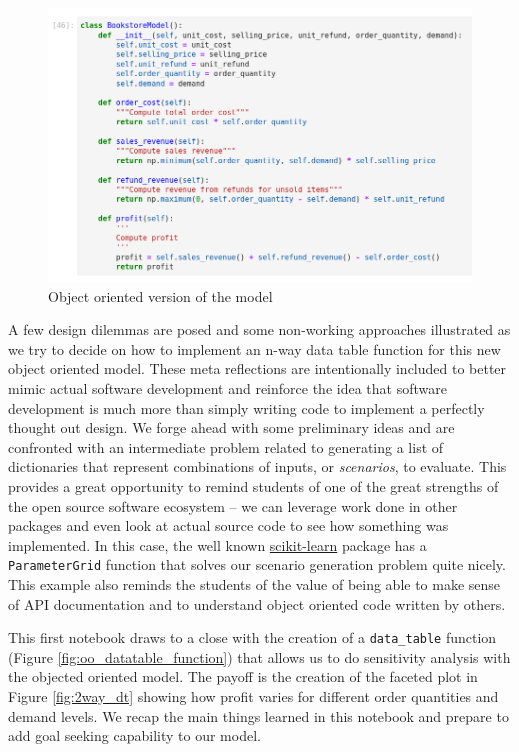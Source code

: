 \documentclass[ited]{informs3}                      %
\newcommand{\code}[1]{\texttt{#1}}
\begin{document}
\begin{figure}[!htbp]
	\centering
	\includegraphics[scale=0.5]{images/oo_model}
	\caption{Object oriented version of the model}
	\label{fig:oo_model}
\end{figure}

A few design dilemmas are posed and some non-working approaches illustrated as we try to decide on how to implement an n-way data table function for this new object oriented model. These meta reflections are intentionally included to better mimic actual software development and reinforce the idea that software development is much more than simply writing code to implement a perfectly thought out design. We forge ahead with some preliminary ideas and are confronted with an intermediate problem related to generating a list of dictionaries that represent combinations of inputs, or \textit{scenarios}, to evaluate. This provides a great opportunity to remind students of one of the great strengths of the open source software ecosystem -- we can leverage work done in other packages and even look at actual source code to see how something was implemented. In this case, the well known \href{https://scikit-learn.org/stable/}{scikit-learn} package \citep{scikit-learn} has a \code{ParameterGrid} function that solves our scenario generation problem quite nicely. This example also reminds the students of the value of being able to make sense of API documentation and to understand object oriented code written by others. 

This first notebook draws to a close with the creation of a \code{data\_table} function (Figure \ref{fig:oo_datatable_function}) that allows us to do sensitivity analysis with the objected oriented model. The payoff is the creation of the faceted plot in Figure \ref{fig:2way_dt} showing how profit varies for different order quantities and demand levels. We recap the main things learned in this notebook and prepare to add goal seeking capability to our model.
\end{document}
